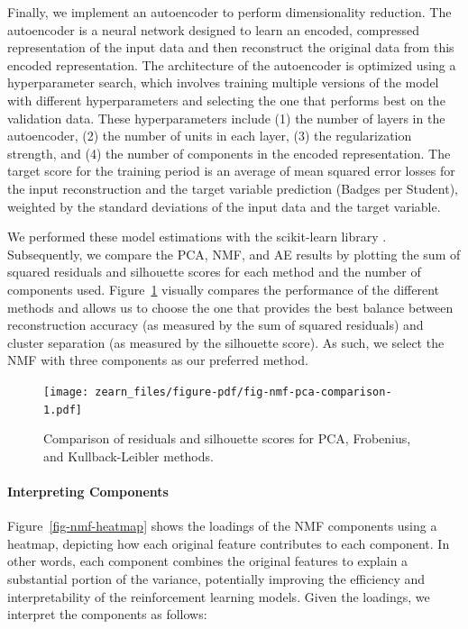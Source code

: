 \documentclass[
  number,
  preprint,
  3p,
  onecolumn]{elsarticle}
\let\oldparagraph\paragraph
\renewcommand{\paragraph}[1]{\oldparagraph{#1}\mbox{}}
\begin{document}
Finally, we implement an autoencoder to perform dimensionality
reduction. The autoencoder is a neural network designed to learn an
encoded, compressed representation of the input data and then
reconstruct the original data from this encoded representation. The
architecture of the autoencoder is optimized using a hyperparameter
search, which involves training multiple versions of the model with
different hyperparameters and selecting the one that performs best on
the validation data. These hyperparameters include (1) the number of
layers in the autoencoder, (2) the number of units in each layer, (3)
the regularization strength, and (4) the number of components in the
encoded representation. The target score for the training period is an
average of mean squared error losses for the input reconstruction and
the target variable prediction (Badges per Student), weighted by the
standard deviations of the input data and the target variable.

We performed these model estimations with the scikit-learn library
\citep{pedregosa2011}. Subsequently, we compare the PCA, NMF, and AE
results by plotting the sum of squared residuals and silhouette scores
for each method and the number of components used.
Figure~\ref{fig-nmf-pca-comparison} visually compares the performance of
the different methods and allows us to choose the one that provides the
best balance between reconstruction accuracy (as measured by the sum of
squared residuals) and cluster separation (as measured by the silhouette
score). As such, we select the NMF with three components as our
preferred method.

\begin{figure}

{\centering \texttt{[image: zearn\_files/figure-pdf/fig-nmf-pca-comparison-1.pdf]}

}

\caption{\label{fig-nmf-pca-comparison}Comparison of residuals and
silhouette scores for PCA, Frobenius, and Kullback-Leibler methods.}

\end{figure}

\hypertarget{interpreting-components}{%
\paragraph{Interpreting Components}\label{interpreting-components}}

Figure~\ref{fig-nmf-heatmap} shows the loadings of the NMF components
using a heatmap, depicting how each original feature contributes to each
component. In other words, each component combines the original features
to explain a substantial portion of the variance, potentially improving
the efficiency and interpretability of the reinforcement learning
models. Given the loadings, we interpret the components as follows:
\end{document}
